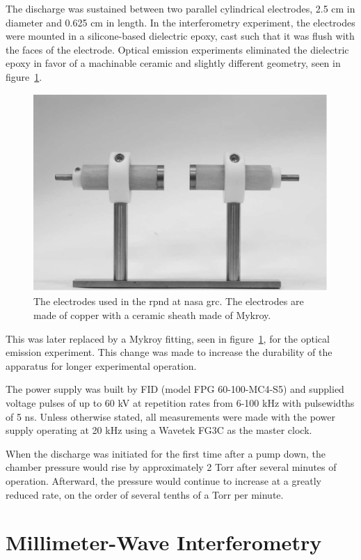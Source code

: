 The discharge was sustained between two parallel cylindrical electrodes, 2.5 cm
in diameter and 0.625 cm in length. In the interferometry experiment, the
electrodes were mounted in a silicone-based dielectric epoxy, cast such that it
was flush with the faces of the electrode. Optical emission experiments
eliminated the dielectric epoxy in favor of a machinable ceramic and slightly
different geometry, seen in figure~\ref{fig:electrodes}.
\begin{figure}
  \centering
  \includegraphics{./chapters/nasa/figures/electrodes.pdf}
  \caption{The electrodes used in the \acs{rpnd} at \acs{nasa} \acs{grc}. The
    electrodes are made of copper with a ceramic sheath made of Mykroy.}
  \label{fig:electrodes}
\end{figure}


This was later replaced by a Mykroy
fitting, seen in figure~\ref{fig:electrodes}, for the optical emission
experiment. This change was made to increase the durability of the apparatus for
longer experimental operation.

The power supply was built by FID (model FPG 60-100-MC4-S5) and supplied voltage
pulses of up to 60 kV at repetition rates from 6-100 kHz with pulsewidths of 5
ns. Unless otherwise stated, all measurements were made with the power supply
operating at 20 kHz using a Wavetek FG3C as the master clock.

When the discharge was
initiated for the first time after a pump down, the chamber pressure would rise
by approximately 2 Torr after several minutes of operation. Afterward, the
pressure would continue to increase at a greatly reduced rate, on the order of
several tenths of a Torr per minute.
\section{Millimeter-Wave Interferometry}



